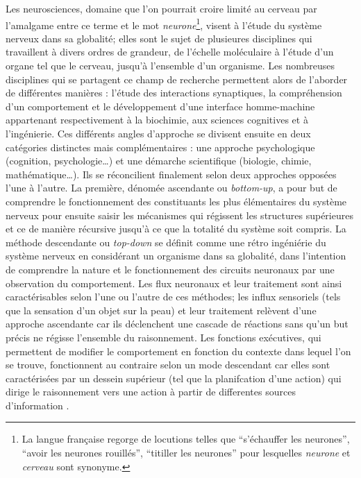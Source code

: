 \documentclass[12pt,fleqn,oneside,openany]{book} %
\begin{document}
Les neurosciences, domaine que l'on pourrait croire limité au cerveau par l'amalgame entre ce terme et le mot \emph{neurone}\footnote{La langue française regorge de locutions telles que ``s'échauffer les neurones'', ``avoir les neurones rouillés'', ``titiller les neurones'' pour lesquelles \emph{neurone} et \emph{cerveau} sont synonyme.}, visent à l'étude du système nerveux dans sa globalité; elles sont le sujet de plusieures disciplines qui travaillent à divers ordres de grandeur, de l'échelle moléculaire à l'étude d'un organe tel que le cerveau, jusqu'à l'ensemble d'un organisme. Les nombreuses disciplines qui se partagent ce champ de recherche permettent alors de l'aborder de différentes manières : l'étude des interactions synaptiques, la compréhension d'un comportement et le développement d'une interface homme-machine appartenant respectivement à la biochimie, aux sciences cognitives et à l'ingénierie. Ces différents angles d'approche se divisent ensuite en deux catégories distinctes mais complémentaires : une approche psychologique (cognition, psychologie…) et une démarche scientifique (biologie, chimie, mathématique…). Ils se réconcilient finalement selon deux approches opposées l'une à l'autre. La première, dénomée ascendante ou \emph{bottom-up}, a pour but de comprendre le fonctionnement des constituants les plus élémentaires du système nerveux pour ensuite saisir les mécanismes qui régissent les structures supérieures et ce de manière récursive jusqu'à ce que la totalité du système soit compris. La méthode descendante ou \emph{top-down} se définit comme une rétro ingéniérie du système nerveux en considérant un organisme dans sa globalité, dans l'intention de comprendre la nature et le fonctionnement des circuits neuronaux par une observation du comportement. Les flux neuronaux et leur traitement sont ainsi caractérisables selon l'une ou l'autre de ces méthodes; les influx sensoriels (tels que la sensation d'un objet sur la peau) et leur traitement relèvent d'une approche ascendante car ils déclenchent une cascade de réactions sans qu'un but précis ne régisse l'ensemble du raisonnement. Les fonctions exécutives, qui permettent de modifier le comportement en fonction du contexte dans lequel l'on se trouve, fonctionnent au contraire selon un mode descendant car elles sont caractérisées par un dessein supérieur (tel que la planifcation d'une action) qui dirige le raisonnement vers une action à partir de differentes sources d'information \cite{bottomupTopdown,foncExec}.

\begin{figure}[h]
\end{figure}
\end{document}

